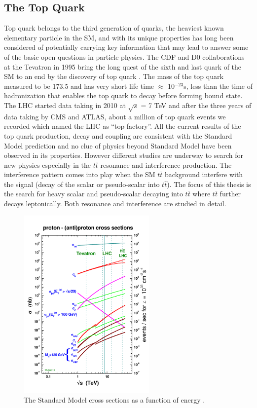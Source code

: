 \subsection{The Top Quark}
Top quark belongs to the third generation of quarks, the heaviest known elementary particle in the SM, and with its unique properties has long been considered of potentially carrying key information that may lead to answer some of the basic open questions in particle physics. The CDF and D0 collaborations at the Tevatron in 1995 bring the long quest of the sixth and last quark of the SM to an end by the discovery of top quark \cite{top_quark}. The mass of the top quark measured to be 173.5 and has very short life time $\approx$ 10$^{-23}$s, less than the time of hadronization that enables the top quark to decay before forming bound state. The LHC started data taking in 2010 at $\sqrt{s}$ = 7 TeV and after the three years of data taking by CMS and ATLAS, about a million of top quark events we recorded which named the LHC as “top factory”. All the current results of the top quark production, decay and coupling are consistent with the Standard Model prediction and no clue of physics beyond Standard Model have been observed in its properties. However different studies are underway to search for new physics especially in the $t\bar{t}$ resonance and interference production. The interference pattern comes into play when the SM $t\bar{t}$ background interfere with the signal (decay of the scalar or pseudo-scalar into $t\bar{t}$). The focus of this thesis is the search for heavy scalar and pseudo-scalar decaying into $t\bar{t}$ where $t\bar{t}$ further decays leptonically. Both resonance and interference are studied in detail. 
\begin{figure}[h]
\centering
\includegraphics[width=0.6\textwidth]{fig/chapt2/crosssections2012HE_v4.pdf}
\caption{\label{fig:lhclumi_plot}The Standard Model cross sections as a function of energy \cite{lhclumi_plot}.}
\end{figure}
